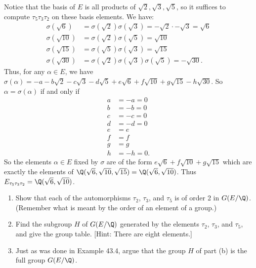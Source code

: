 \begin{solution}
  Notice that the basis of $E$ is all products of $\sqrt{2}, \sqrt{3}, \sqrt{5}$, so it suffices to compute $\tau_5\tau_3\tau_2$ on these basis elements. We have:
  \begin{align*}
    \sigma(\sqrt{6}) &= \sigma(\sqrt{2})\sigma(\sqrt{3}) = -\sqrt{2} \cdot -\sqrt 3 = \sqrt{6} \\
    \sigma(\sqrt{10}) &= \sigma(\sqrt{2})\sigma(\sqrt{5}) = \sqrt{10} \\
    \sigma(\sqrt{15}) &= \sigma(\sqrt{5})\sigma(\sqrt{3}) = \sqrt{15} \\
    \sigma(\sqrt{30}) &= \sigma(\sqrt{2})\sigma(\sqrt{3})\sigma(\sqrt{5}) = -\sqrt{30}
  .\end{align*}
  Thus, for any $\alpha\in E$, we have $\sigma(\alpha) = -a - b\sqrt{2} - c\sqrt{3} - d\sqrt{5} + e\sqrt{6} + f\sqrt{10} + g\sqrt{15} - h\sqrt{30}$. So $\alpha = \sigma(\alpha)$ if and only if
  \begin{align*}
    a &= -a = 0 \\
    b &= -b = 0 \\
    c &= -c = 0 \\
    d &= -d = 0 \\
    e &= e \\
    f &= f \\
    g &= g \\
    h &= -h = 0
  .\end{align*}
  So the elements $\alpha \in E$ fixed by $\sigma$ are of the form $e\sqrt{6} + f\sqrt{10} + g\sqrt{15}$ which are exactly the elements of $\Q(\sqrt{6}, \sqrt{10}, \sqrt{15}) = \Q(\sqrt{6}, \sqrt{10})$. Thus $E_{\tau_5\tau_3\tau_2} = \Q(\sqrt{6}, \sqrt{10})$.
\end{solution}

\begin{problem}[43.22]
  \begin{enumerate}
    \item Show that each of the automorphisms $\tau_2$, $\tau_3$, and $\tau_5$ is of order 2 in $G(E/\Q)$. (Remember what is meant by the order of an element of a group.)
    \item Find the subgroup $H$ of $G(E/\Q)$ generated by the elements $\tau_2$, $\tau_3$, and $\tau_5$, and give the group table. [Hint: There are eight elements.]
    \item Just as was done in Example 43.4, argue that the group $H$ of part (b) is the full group $G(E/\Q)$.
  \end{enumerate}
\end{problem}

